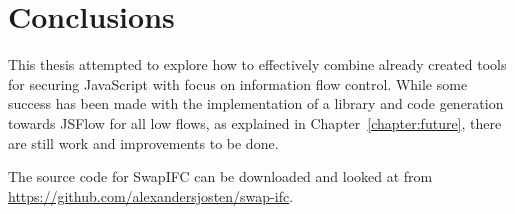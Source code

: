 \chapter{Conclusions}
This thesis attempted to explore how to effectively combine already created tools for securing JavaScript with focus on information flow control. While some success has been made with the implementation of a library and code generation towards JSFlow for all low flows, as explained in Chapter~\ref{chapter:future}, there are still work and improvements to be done.



The source code for SwapIFC can be downloaded and looked at from \url{https://github.com/alexandersjosten/swap-ifc}.
